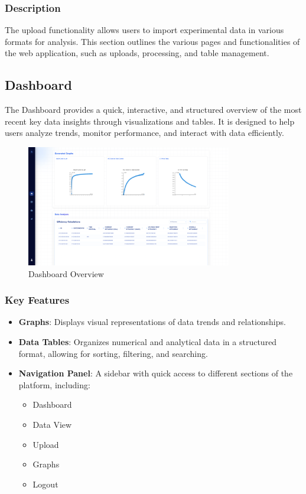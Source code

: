\documentclass[12pt]{article}
\begin{document}
\subsubsection*{Description}
The upload functionality allows users to import experimental data in various
formats for analysis.
This section outlines the various pages and functionalities of the web
application, such as uploads, processing, and table management.

\subsection{Dashboard}

The Dashboard provides a quick, interactive, and structured overview of the most
recent key data insights through visualizations and tables. It is designed to
help users analyze trends, monitor performance, and interact with data
efficiently.

\begin{figure}[H]
    \centering
    \includegraphics[width=0.8\textwidth]{./Diagrams/Dashboard.png}
    \caption{Dashboard Overview}
\end{figure}


\subsubsection{Key Features}
\begin{itemize}
    \item \textbf{Graphs}: Displays visual representations of data trends and
    relationships.
    \item \textbf{Data Tables}: Organizes numerical and analytical data in a
    structured format, allowing for sorting, filtering, and searching.
    \item \textbf{Navigation Panel}: A sidebar with quick access to different
    sections of the platform, including:
    \begin{itemize}
        \item Dashboard
        \item Data View
        \item Upload
        \item Graphs
        \item Logout
    \end{itemize}
\end{itemize}
\end{document}
